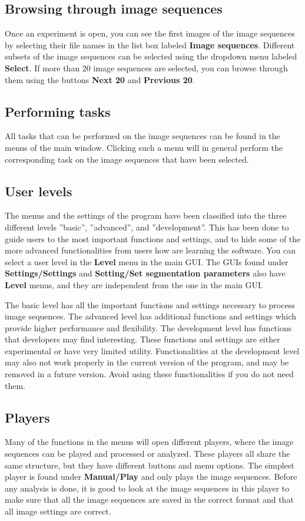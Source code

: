 \documentclass[a4paper, oneside, onecolumn, 11pt]{article}
\newcommand{\menu}[1]{\textbf{#1}}
\newcommand{\setting}[1]{''#1''}
\newcommand{\control}[1]{\textbf{#1}}
\begin{document}
\subsection{Browsing through image sequences}
Once an experiment is open, you can see the first images of the image sequences by selecting their file names in the list box labeled \control{Image sequences}. Different subsets of the image sequences can be selected using the dropdown menu labeled \control{Select}. If more than 20 image sequences are selected, you can browse through them using the buttons \control{Next 20} and \control{Previous 20}.

\subsection{Performing tasks}
All tasks that can be performed on the image sequences can be found in the menus of the main window. Clicking such a menu will in general perform the corresponding task on the image sequences that have been selected.

\subsection{User levels}
The menus and the settings of the program have been classified into the three different levels \setting{basic}, \setting{advanced}, and \setting{development}. This has been done to guide users to the most important functions and settings, and to hide some of the more advanced functionalities from users how are learning the software. You can select a user level in the \menu{Level} menu in the main GUI. The GUIs found under \menu{Settings/Settings} and \menu{Setting/Set segmentation parameters} also have \menu{Level} menus, and they are independent from the one in the main GUI.

The basic level has all the important functions and settings necessary to process image sequences. The advanced level has additional functions and settings which provide higher performance and flexibility. The development level has functions that developers may find interesting. These functions and settings are either experimental or have very limited utility. Functionalities at the development level may also not work properly in the current version of the program, and may be removed in a future version. Avoid using these functionalities if you do not need them.

\subsection{Players}
\label{sec:players}
Many of the functions in the menus will open different players, where the image sequences can be played and processed or analyzed. These players all share the same structure, but they have different buttons and menu options. The simplest player is found under \menu{Manual/\allowbreak Play} and only plays the image sequences. Before any analysis is done, it is good to look at the image sequences in this player to make sure that all the image sequences are saved in the correct format and that all image settings are correct.
\end{document}

